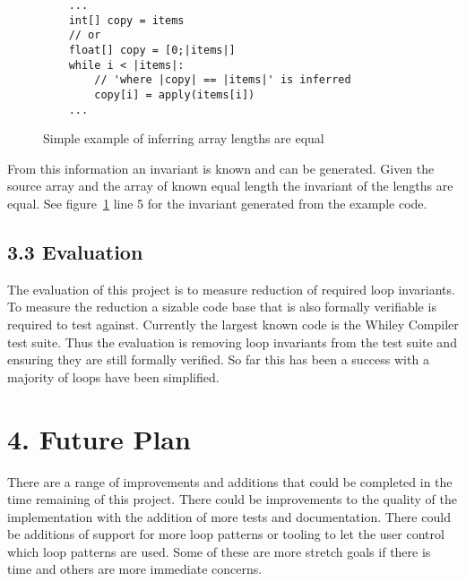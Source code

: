 \documentclass[11pt, a4paper, twoside, openright]{report}
\begin{document}
\begin{figure}[ht]
\begin{lstlisting}
    ...
    int[] copy = items
    // or
    float[] copy = [0;|items|]
    while i < |items|:
        // 'where |copy| == |items|' is inferred
        copy[i] = apply(items[i])
    ...
\end{lstlisting}
\caption{Simple example of inferring array lengths are equal}
\label{lst:whiley-length}
\end{figure}

From this information an invariant is known and can be generated.
Given the source array and the array of known equal length the
invariant of the lengths are equal.
See figure~\ref{lst:whiley-length} line 5 for the invariant generated
from the example code.

\subsection*{3.3 Evaluation}

The evaluation of this project is to measure reduction of required loop
invariants.
To measure the reduction a sizable code base that is also formally verifiable
is required to test against.
Currently the largest known code is the Whiley Compiler test suite.
Thus the evaluation is removing loop invariants from the test suite and
ensuring they are still formally verified.
So far this has been a success with a majority of loops have been simplified.

\section*{4. Future Plan}

There are a range of improvements and additions that could be completed in
the time remaining of this project.
There could be improvements to the quality of the implementation with
the addition of more tests and documentation.
There could be additions of support for more loop patterns or tooling
to let the user control which loop patterns are used.
Some of these are more stretch goals if there is time and
others are more immediate concerns.
\end{document}
